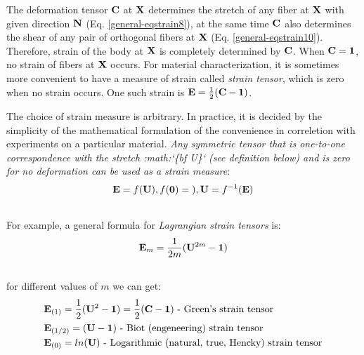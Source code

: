\documentclass[letterpaper,10pt,english]{sphinxmanual}
\begin{document}
The deformation tensor ${\bf C}$ at ${\bf X}$ determines the stretch of any fiber at ${\bf X}$ with given direction ${\bf N}$ (Eq. \eqref{general-eqstrain8}), at the same time ${\bf C}$ also determines the shear of any pair of orthogonal fibers at ${\bf X}$ (Eq. \eqref{general-eqstrain10}). Therefore, strain of the body at ${\bf X}$ is completely determined by ${\bf C}$. When ${\bf C}={\bf 1}$, no strain of fibers at ${\bf X}$ occurs. For material characterization, it is sometimes more convenient to have a measure of strain called \emph{strain tensor}, which is zero when no strain occurs. One such strain is ${\bf E}=\frac{1}{2}({\bf C} - {\bf 1})$.

The choice of strain measure is arbitrary. In practice, it is decided by the simplicity of the mathematical formulation of the convenience in correletion with experiments on a particular material. \emph{Any symmetric tensor that is one-to-one correspondence with the stretch :math:{}`\{bf U\}{}` (see definition below) and is zero for no deformation can be used as a strain measure}:
\label{general:equation-eqstrain12}\begin{gather}
\begin{split}{\bf E} = f({\bf U}), f({\bf 0}) = {\bf )}, {\bf U} = f^{-1}({\bf E})\end{split}\label{general-eqstrain12}\\\begin{split}\end{split}\notag
\end{gather}
For example, a general formula for \emph{Lagrangian strain tensors} is:
\label{general:equation-eqstrain13}\begin{gather}
\begin{split}{\bf E}_m = \frac{1}{2m}({\bf U}^{2m} - {\bf 1})\end{split}\label{general-eqstrain13}\\\begin{split}\end{split}\notag
\end{gather}
for different values of $m$ we can get:
\label{general:equation-eqstrain14}\begin{gather}
\begin{split}\begin{split}
&{\bf E}_{(1)} = \frac{1}{2}({\bf U}^2 - {\bf 1}) = \frac{1}{2}({\bf C} - {\bf 1}) \text{ - Green's strain tensor} \\
&{\bf E}_{(1/2)} = ({\bf U} - {\bf 1}) \text{ - Biot (engeneering) strain tensor} \\
&{\bf E}_{(0)} = ln({\bf U}) \text{ - Logarithmic (natural, true, Hencky) strain tensor}
\end{split}\end{split}\label{general-eqstrain14}\\\begin{split}\end{split}\notag
\end{gather}
\end{document}
